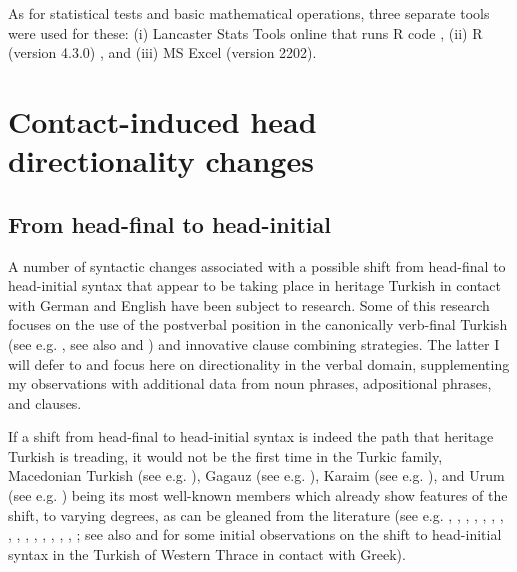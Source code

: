 \documentclass[output=paper,colorlinks,citecolor=brown]{langscibook}
\begin{document}
As for statistical tests and basic mathematical operations, three separate tools were used for these: (i) Lancaster Stats Tools online that runs R code \citep{Brezina.2018}, (ii) R (version 4.3.0) \citep{RCoreTeam.2021}, and (iii) MS Excel (version 2202).

\section{Contact-induced head directionality changes}
\label{sec:keskin:DHHD_TR}

\subsection{From head-final to head-initial}
\label{sec:keskin:word_order_intro}

A number of syntactic changes associated with a possible shift from head-final to head-initial syntax that appear to be taking place in heritage Turkish in contact with German and English have been subject to research. Some of this research focuses on the use of the postverbal position in the canonically verb-final Turkish (see e.g. \citealt{Iefremenko.turkur.RUEG,Schroeder.post.register,Schroeder.Iefremenko.turkur,Iefremenko.post.poster,Schroeder.Iefremenko.Oncu.post}, see also \cite{chapters/11} and \citealt{Iefremenko.kur.loc.goal,Iefremenko.kur.ICIL,Iefremenko.kur.TU}) and innovative clause combining strategies. The latter I will defer to  and focus here on directionality in the verbal domain, supplementing my observations with additional data from noun phrases, adpositional phrases, and clauses. 

If a shift from head-final to head-initial syntax is indeed the path that heritage Turkish is treading, it would not be the first time in the Turkic family, Macedonian Turkish (see e.g. \citealt{MatrasTufan.2007}), Gagauz (see e.g. \citealt{Menz.1999}), Karaim (see e.g. \citealt{Csato.2000}), and Urum (see e.g. \citealt{Bohm.2015,Skopeteas.2015}) being its most well-known members which already show features of the shift, to varying degrees, as can be gleaned from the literature (see e.g. \citealt{Balci.2010}, \citealt[271]{Doerfer.1959}, \citealt[33--35]{Friedman.1982}, \citealt[40--41]{Friedman.2006}, \citealt[110--111]{Gulsevin.2017}, \citealt[471--475]{Gunsen.2010}, \citealt[129]{Igci.2010}, \citealt[148--49]{Jable.2010}, \citealt[790, 936]{Johanson.2021}, \citealt[165]{Katona.1969}, \citealt{Kirli.2001}, \citealt[251]{Matras.2009}, \citealt{MatrasTufan.2007}, \citealt[40]{Menz.1999}, \citealt[61--62]{Menz.2014}, \citealt[209–210]{Ozkan.1996}; see also \citealt[226]{Petrou.diglossia} and \citealt[342]{Petrou.Westthrakien} for some initial observations on the shift to head-initial syntax in the Turkish of Western Thrace in contact with Greek). 
\end{document}
